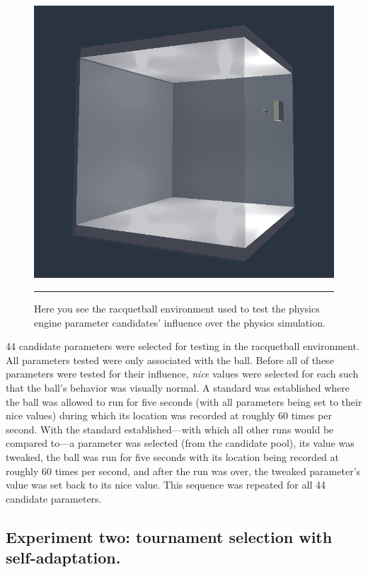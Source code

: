 \begin{figure}[htbp]
\centering
\includegraphics[scale=0.4]{../Figures/Chapter4/racquetball.png}
\rule{35em}{0.5pt}
\caption[Physics Engine Parameter Influence Racquetball Environment]{Here you see the racquetball environment used to test the physics engine parameter candidates' influence over the physics simulation.}
\label{fig:racquetball}
\end{figure}

44 candidate parameters were selected for testing in the racquetball environment. All parameters tested were only associated with the ball. Before all of these parameters were tested for their influence, \textit{nice} values were selected for each such that the ball's behavior was visually normal. A standard was established where the ball was allowed to run for five seconds (with all parameters being set to their nice values) during which its location was recorded at roughly 60 times per second. With the standard established---with which all other runs would be compared to---a parameter was selected (from the candidate pool), its value was tweaked, the ball was run for five seconds with its location being recorded at roughly 60 times per second, and after the run was over, the tweaked parameter's value was set back to its nice value. This sequence was repeated for all 44 candidate parameters.

\subsection[Experiment Two]{Experiment two: tournament selection with self-adaptation.}

